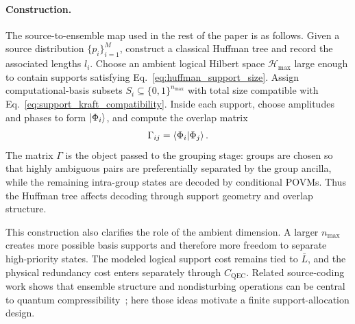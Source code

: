 \documentclass[
 reprint,
 amsmath,amssymb,
 aps,
 pra,
 floatfix,
]{revtex4-2}
\begin{document}
\paragraph*{Construction.}
The source-to-ensemble map used in the rest of the paper is as follows. Given a source distribution $\{p_i\}_{i=1}^M$, construct a classical Huffman tree and record the associated lengths $l_i$. Choose an ambient logical Hilbert space $\mathcal H_{\max}$ large enough to contain supports satisfying Eq.~\eqref{eq:huffman_support_size}. Assign computational-basis subsets $S_i\subseteq\{0,1\}^{n_{\max}}$ with total size compatible with Eq.~\eqref{eq:support_kraft_compatibility}. Inside each support, choose amplitudes and phases to form $\ket{\Phi_i}$, and compute the overlap matrix
\begin{equation}
    \Gamma_{ij}=\braket{\Phi_i|\Phi_j}.
\end{equation}
The matrix $\Gamma$ is the object passed to the grouping stage: groups are chosen so that highly ambiguous pairs are preferentially separated by the group ancilla, while the remaining intra-group states are decoded by conditional POVMs. Thus the Huffman tree affects decoding through support geometry and overlap structure.

This construction also clarifies the role of the ambient dimension. A larger $n_{\max}$ creates more possible basis supports and therefore more freedom to separate high-priority states. The modeled logical support cost remains tied to $\bar L$, and the physical redundancy cost enters separately through $C_{\mathrm{QEC}}$. Related source-coding work shows that ensemble structure and nondisturbing operations can be central to quantum compressibility~\cite{koashi2001compressibility,koashi2002operations}; here those ideas motivate a finite support-allocation design.
\end{document}
